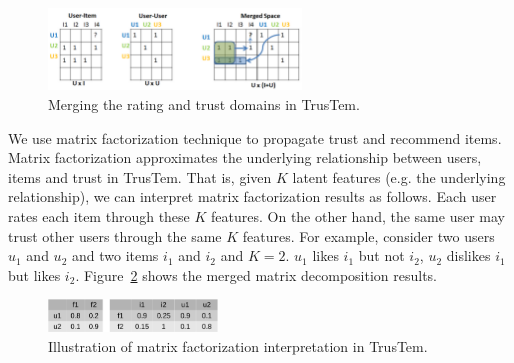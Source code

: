\documentclass[11pt, conference, onecolumn]{IEEEtran}
\begin{document}
\begin{figure}[tp]
\centering
\includegraphics[width=0.6\textwidth]{fig3}
\caption{Merging the rating and trust domains in TrusTem.}
\label{fig:merge}
\end{figure}

We use matrix factorization technique to propagate trust and recommend items. Matrix factorization approximates the underlying relationship between users, items and trust in TrusTem. That is, given $K$ latent features (e.g. the underlying relationship), we can interpret matrix factorization results as follows. Each user  rates each item through these $K$ features. On the other hand, the same user may trust other users through the same $K$ features. For example, consider two users $u_1$ and $u_2$ and two items $i_1$ and $i_2$ and $K=2$. $u_1$ likes $i_1$ but not $i_2$, $u_2$ dislikes $i_1$ but likes $i_2$. Figure~\ref{fig:mf_example} shows the  merged matrix decomposition results.
 
\begin{figure}[tp]
\centering
\includegraphics[width=0.4\textwidth]{example}
\caption{Illustration of matrix factorization interpretation in TrusTem.}
\label{fig:mf_example}
\end{figure}
\end{document}

